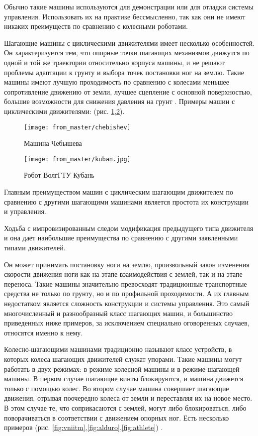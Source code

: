 Обычно такие машины используются для демонстрации или для отладки системы управления. Использовать их на практике бессмысленно, так как они не имеют никаких преимуществ по сравнению с колесными роботами.

Шагающие машины с циклическими движителями имеет несколько особенностей. Он характеризуется тем, что опорные точки шагающих механизмов движутся по одной и той же траектории относительно корпуса машины, и не решают проблемы адаптации к грунту и выбора точек постановки ног на землю. Такие машины имеют лучшую проходимость по сравнению с колесами меньшее сопротивление движению от земли, лучшее сцепление с основной поверхностью, большие возможности для снижения давления на грунт \cite{cruse2001control}. Примеры машин с циклическими движителями: (рис. \ref{fig:chebishev},\ref{fig:kuban}).

\begin{figure}[H]
\centering\texttt{[image: from\_master/chebishev]}
\caption{Машина Чебышева}
\label{fig:chebishev}
\end{figure}

\begin{figure}[H]
\centering\texttt{[image: from\_master/kuban.jpg]}
\caption{Робот ВолгГТУ Кубань}
\label{fig:kuban}
\end{figure}

Главным преимуществом машин с циклическим шагающим движителем по сравнению с другими шагающими машинами является простота их конструкции и управления.

Ходьба с импровизированным следом модификация предыдущего типа движителя и она дает наибольшие преимущества по сравнению с другими заявленными типами движителей. 

Он может принимать постановку ноги на землю, произвольный закон изменения скорости движения ноги как на этапе взаимодействия с землей, так и на этапе переноса. Такие машины значительно превосходят традиционные транспортные средства не только по грунту, но и по профильной проходимости. А их главным недостатком является сложность конструкции и системы управления. Это самый многочисленный и разнообразный класс шагающих машин, и большинство приведенных ниже примеров, за исключением специально оговоренных случаев, относятся именно к нему.

Колесно-шагающими машинами традиционно называют класс устройств, в которых колеса шагающих движителей служат упорами. Такие машины могут работать в двух режимах: в режиме колесной машины и в режиме шагающей машины. В первом случае шагающие винты блокируются, и машина движется только с помощью колес. Во втором случае машина совершает шагающие движения, отрывая поочередно колеса от земли и переставляя их на новое место. В этом случае те, что соприкасаются с землей, могут либо блокироваться, либо поворачиваться в соответствии с движением опорных ног.
Есть несколько примеров (рис. \ref{fig:vniitm},\ref{fig:alduro},\ref{fig:athlete}) \cite{germann2001joystick}.

